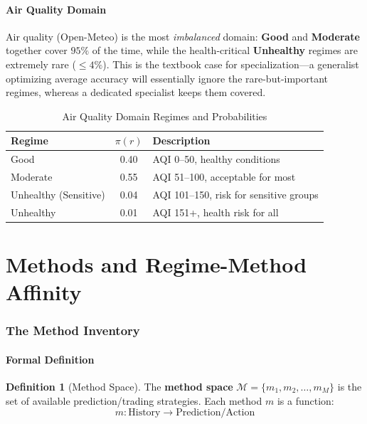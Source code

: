 \documentclass[11pt,a4paper]{article}
\theoremstyle{definition}
\newtheorem{definition}{Definition}[section]
\theoremstyle{plain}
\begin{document}
\subsection{Air Quality Domain}

Air quality (Open-Meteo) is the most \emph{imbalanced} domain: \textbf{Good} and
\textbf{Moderate} together cover $95\%$ of the time, while the
health-critical \textbf{Unhealthy} regimes are extremely rare ($\le 4\%$). This is
the textbook case for specialization---a generalist optimizing average accuracy
will essentially ignore the rare-but-important regimes, whereas a dedicated
specialist keeps them covered.

\begin{table}[H]
\centering
\caption{Air Quality Domain Regimes and Probabilities}
\begin{tabular}{lcp{8cm}}
\toprule
Regime & $\pi(r)$ & Description \\
\midrule
Good & 0.40 & AQI 0--50, healthy conditions \\
Moderate & 0.55 & AQI 51--100, acceptable for most \\
Unhealthy (Sensitive) & 0.04 & AQI 101--150, risk for sensitive groups \\
Unhealthy & 0.01 & AQI 151+, health risk for all \\
\bottomrule
\end{tabular}
\end{table}

\newpage
\part{Methods and Regime-Method Affinity}

\section{The Method Inventory}

\subsection{Formal Definition}

\begin{definition}[Method Space]
The \textbf{method space} $\mathcal{M} = \{m_1, m_2, \ldots, m_M\}$ is the set of available prediction/trading strategies. Each method $m$ is a function:
\begin{equation}
m: \text{History} \to \text{Prediction/Action}
\end{equation}
\end{definition}
\end{document}
